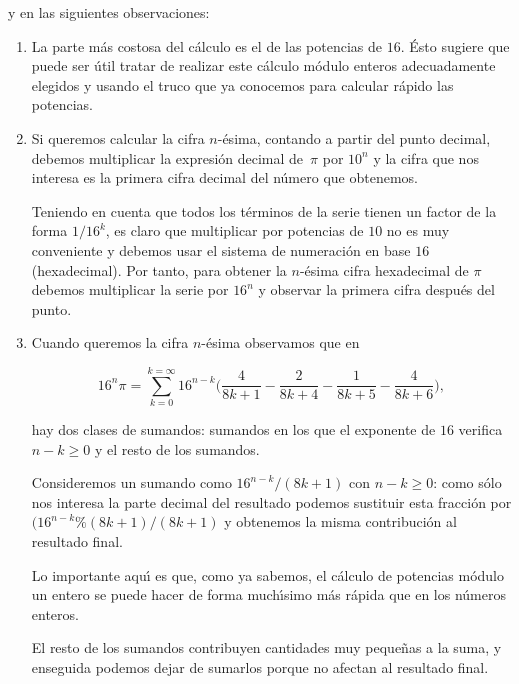 \noindent y en las siguientes observaciones:
\begin{enumerate}
 \item La parte m\'as costosa del c\'alculo es el de las potencias de $16$.
\'Esto sugiere que puede ser \'util
 tratar de realizar este c\'alculo m\'odulo enteros adecuadamente elegidos y
usando el truco que ya conocemos para calcular r\'apido las potencias. 
 
 \item Si queremos calcular la cifra $n$-\'esima, contando a partir del punto
decimal, debemos multiplicar la expresi\'on decimal de~$\pi$ por $10^n$ y la
cifra que nos interesa es la primera cifra decimal del n\'umero
que obtenemos.
 
Teniendo en cuenta que todos los t\'erminos de la serie tienen un factor de la
forma $1/16^k$,  es claro que multiplicar por potencias de $10$ no es muy
conveniente y debemos usar el sistema de numeraci\'on en base $16$
(hexadecimal). Por tanto, para obtener la $n$-\'esima cifra hexadecimal de $\pi$
debemos multiplicar la serie por $16^n$ y observar la primera cifra despu\'es
del punto.
 
 \item Cuando queremos la cifra $n$-\'esima observamos que en 
 
 
 \begin{equation}\label{picifras2}
 16^n\pi=\sum_{k=0}^{k=\infty}16^{n-k}\Big(\frac{4}{8k+1}-\frac{2}{8k+4}-\frac{
 1}
 {8k+5}-\frac{4}{8k+6}\Big),
 \end{equation}
 
 
 
 
hay dos clases de sumandos: sumandos en los que el exponente de $16$ verifica $n-k\ge 0$ y el resto de los
sumandos.  

Consideremos un sumando como $16^{n-k}/(8k+1)$ con $n-k\ge 0$: como s\'olo  nos
interesa la parte decimal del resultado podemos sustituir esta fracci\'on por 
 $(16^{n-k}\%(8k+1)/(8k+1)$ y obtenemos la misma contribuci\'on al resultado
final. 
 
 Lo importante aqu\'{\i} es que, como ya sabemos, el c\'alculo de potencias
m\'odulo 
 un entero se puede hacer de forma much\'{\i}simo m\'as r\'apida que en los
n\'umeros enteros.
 
 El resto de los sumandos contribuyen cantidades muy peque\~nas a la suma,  y
enseguida podemos dejar de sumarlos porque no afectan al resultado final.
 
 \end{enumerate}
 
